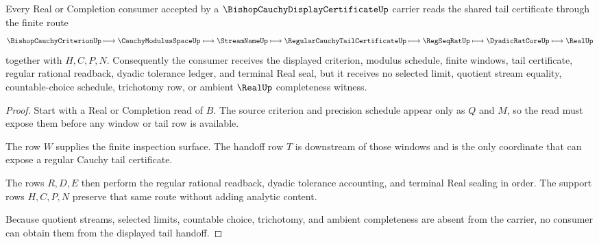 \begin{theorem}
\label{thm:bishop-cauchy-display-certificate-tail-handoff}
Every Real or Completion consumer accepted by a $\BishopCauchyDisplayCertificateUp$ carrier reads the shared tail certificate through the finite route
$$
\BishopCauchyCriterionUp \longmapsto \CauchyModulusSpaceUp \longmapsto \StreamNameUp \longmapsto \RegularCauchyTailCertificateUp \longmapsto \RegSeqRatUp \longmapsto \DyadicRatCoreUp \longmapsto \RealUp
$$
together with $H,C,P,N$. Consequently the consumer receives the displayed criterion, modulus schedule, finite windows, tail certificate, regular rational readback, dyadic tolerance ledger, and terminal Real seal, but it receives no selected limit, quotient stream equality, countable-choice schedule, trichotomy row, or ambient $\RealUp$ completeness witness.
\end{theorem}
\begin{proof}
Start with a Real or Completion read of $B$. The source criterion and precision schedule appear only as $Q$ and $M$, so the read must expose them before any window or tail row is available.

The row $W$ supplies the finite inspection surface. The handoff row $T$ is downstream of those windows and is the only coordinate that can expose a regular Cauchy tail certificate.

The rows $R,D,E$ then perform the regular rational readback, dyadic tolerance accounting, and terminal Real sealing in order. The support rows $H,C,P,N$ preserve that same route without adding analytic content.

Because quotient streams, selected limits, countable choice, trichotomy, and ambient completeness are absent from the carrier, no consumer can obtain them from the displayed tail handoff.
\end{proof}


